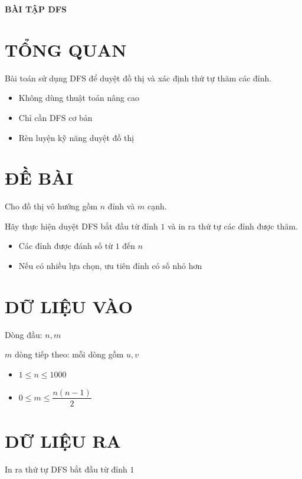 \documentclass[a4paper,12pt]{article}
\begin{document}
\begin{center}
    \textbf{\Large BÀI TẬP DFS}
\end{center}

\section*{TỔNG QUAN}
\begin{tcolorbox}
Bài toán sử dụng DFS để duyệt đồ thị và xác định thứ tự thăm các đỉnh.
\end{tcolorbox}

\begin{itemize}
\item Không dùng thuật toán nâng cao
\item Chỉ cần DFS cơ bản
\item Rèn luyện kỹ năng duyệt đồ thị
\end{itemize}

\section*{ĐỀ BÀI}
\begin{tcolorbox}
Cho đồ thị vô hướng gồm $n$ đỉnh và $m$ cạnh.

Hãy thực hiện duyệt DFS bắt đầu từ đỉnh $1$ và in ra thứ tự các đỉnh được thăm.
\end{tcolorbox}

\begin{itemize}
\item Các đỉnh được đánh số từ $1$ đến $n$
\item Nếu có nhiều lựa chọn, ưu tiên đỉnh có số nhỏ hơn
\end{itemize}

\section*{DỮ LIỆU VÀO}
\begin{tcolorbox}
Dòng đầu: $n, m$

$m$ dòng tiếp theo: mỗi dòng gồm $u, v$
\end{tcolorbox}

\begin{itemize}
\item $1 \le n \le 1000$
\item $0 \le m \le \dfrac{n(n-1)}{2}$
\end{itemize}

\section*{DỮ LIỆU RA}
\begin{tcolorbox}
In ra thứ tự DFS bắt đầu từ đỉnh $1$
\end{tcolorbox}
\end{document}
